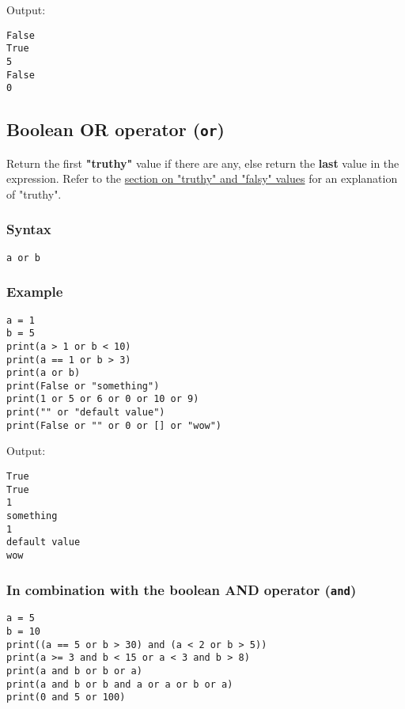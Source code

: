 \documentclass[11pt]{article}
\begin{document}
 \noindent Output:

\begin{verbatim}
False
True
5
False
0
\end{verbatim}


 \newpage

\subsection{Boolean OR operator (\texttt{or})}
\label{sec:org89146a6}
Return the first \textbf{"truthy"} value if there are any, else return the \textbf{last} value in the expression. Refer to the \hyperref[orgf40bd7d]{section on "truthy" and "falsy" values} for an explanation of "truthy".

\subsubsection{Syntax}
\label{sec:org9bde34f}
\begin{verbatim}
a or b
\end{verbatim}

\subsubsection{Example}
\label{sec:orgca02704}
\begin{verbatim}
a = 1
b = 5
print(a > 1 or b < 10)
print(a == 1 or b > 3)
print(a or b)
print(False or "something")
print(1 or 5 or 6 or 0 or 10 or 9)
print("" or "default value")
print(False or "" or 0 or [] or "wow")
\end{verbatim}

 \noindent Output:

\begin{verbatim}
True
True
1
something
1
default value
wow
\end{verbatim}


 \newpage

\subsubsection{In combination with the boolean AND operator (\texttt{and})}
\label{sec:orgcf84b8e}
\begin{verbatim}
a = 5
b = 10
print((a == 5 or b > 30) and (a < 2 or b > 5))
print(a >= 3 and b < 15 or a < 3 and b > 8)
print(a and b or b or a)
print(a and b or b and a or a or b or a)
print(0 and 5 or 100)
\end{verbatim}
\end{document}
